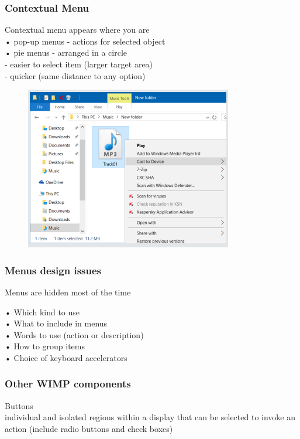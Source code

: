 \documentclass[]{project_plan}
\begin{document}
\subsubsection{Contextual Menu}
Contextual menu appears where you are\\
• pop-up menus - actions for selected object\\
• pie menus - arranged in a circle\\
- easier to select item (larger target area)\\
- quicker (same distance to any option)

\begin{figure}[h!]
  \centering
  \includegraphics[width=\linewidth]{context_menu.png}
\end{figure}

\subsubsection{Menus design issues}
Menus are hidden most of the time

• Which kind to use\\
• What to include in menus\\
• Words to use (action or description)\\
• How to group items\\
• Choice of keyboard accelerators

\subsubsection{Other WIMP components}
Buttons\\
individual and isolated regions within a display that can be selected to invoke
an action (include radio buttons and check boxes)
\end{document}
